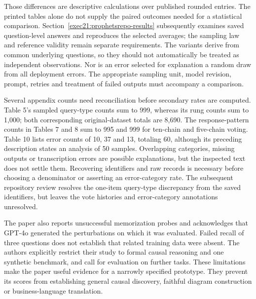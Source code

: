 Those differences are descriptive calculations over published rounded entries.
The printed tables alone do not supply the paired outcomes needed for a statistical comparison. Section~\ref{exec21:prophetsrepo-results} subsequently examines saved question-level answers and reproduces the selected averages; the sampling law and reference validity remain separate requirements. The variants derive
from common underlying questions, so they should not automatically be treated
as independent observations. Nor is an error selected for explanation a random
draw from all deployment errors. The appropriate sampling unit, model revision,
prompt, retries and treatment of failed outputs must accompany a comparison.

Several appendix counts need reconciliation before secondary rates are computed.
Table 5's sampled query-type counts sum to 999, whereas its rung counts sum to
1,000; both corresponding original-dataset totals are 8,690. The response-pattern
counts in Tables 7 and 8 sum to 995 and 999 for ten-chain and five-chain voting.
Table 10 lists error counts of 10, 37 and 13, totaling 60, although its preceding
description states an analysis of 50 samples. Overlapping categories, missing
outputs or transcription errors are possible explanations, but the inspected
text does not settle them. Recovering identifiers and raw records is necessary
before choosing a denominator or asserting an error-category rate. The subsequent repository review resolves the one-item query-type discrepancy from the saved identifiers, but leaves the vote histories and error-category annotations unresolved.
\citep{exec21_prophets,exec21_prophets_reference}

The paper also reports unsuccessful memorization probes and acknowledges that
GPT-4o generated the perturbations on which it was evaluated. Failed recall of
three questions does not establish that related training data were absent.
The authors explicitly restrict their study to formal causal reasoning and one
synthetic benchmark, and call for evaluation on further tasks. These limitations
make the paper useful evidence for a narrowly specified prototype. They prevent
its scores from establishing general causal discovery, faithful diagram
construction or business-language translation.~\citep{exec21_prophets}

